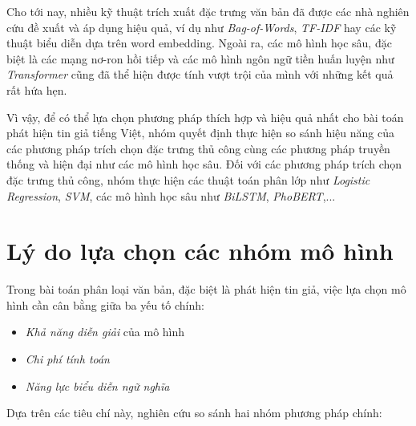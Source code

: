 \documentclass[12pt, a4paper]{report}
\begin{document}
Cho tới nay, nhiều kỹ thuật trích xuất đặc trưng văn bản đã được các nhà nghiên cứu đề xuất và áp dụng hiệu quả, ví dụ như \textit{Bag-of-Words}, \textit{TF-IDF} hay các kỹ thuật biểu diễn dựa trên word embedding. Ngoài ra, các mô hình học sâu, đặc biệt là các mạng nơ-ron hồi tiếp và các mô hình ngôn ngữ tiền huấn luyện như \textit{Transformer} cũng đã thể hiện được tính vượt trội của mình với những kết quả rất hứa hẹn.

Vì vậy, để có thể lựa chọn phương pháp thích hợp và hiệu quả nhất cho bài toán phát hiện tin giả tiếng Việt, nhóm quyết định thực hiện so sánh hiệu năng của các phương pháp trích chọn đặc trưng thủ công cùng các phương pháp truyền thống và hiện đại như các mô hình học sâu. Đối với các phương pháp trích chọn đặc trưng thủ công, nhóm thực hiện các thuật toán phân lớp như \textit{Logistic Regression}, \textit{SVM}, các mô hình học sâu như \textit{BiLSTM}, \textit{PhoBERT},...


\section{Lý do lựa chọn các nhóm mô hình}
\label{sec:model_selection}

Trong bài toán phân loại văn bản, đặc biệt là phát hiện tin giả,
việc lựa chọn mô hình cần cân bằng giữa ba yếu tố chính:

\begin{itemize}
    \item \textit{Khả năng diễn giải} của mô hình
    \item \textit{Chi phí tính toán}
    \item \textit{Năng lực biểu diễn ngữ nghĩa}
\end{itemize}

Dựa trên các tiêu chí này, nghiên cứu so sánh hai nhóm phương pháp chính:
\end{document}
